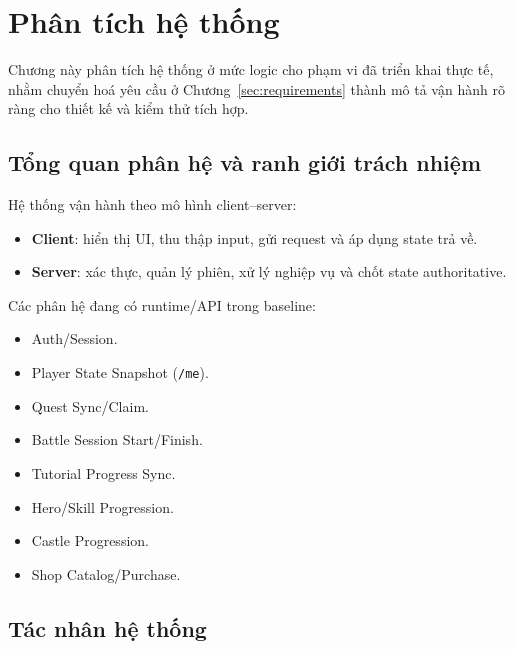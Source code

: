 \section{Phân tích hệ thống}
\label{sec:analysis}

Chương này phân tích hệ thống ở mức logic cho phạm vi đã triển khai thực tế, nhằm chuyển hoá yêu cầu ở Chương~\ref{sec:requirements} thành mô tả vận hành rõ ràng cho thiết kế và kiểm thử tích hợp.

\subsection{Tổng quan phân hệ và ranh giới trách nhiệm}
\label{subsec:analysis_overview}

Hệ thống vận hành theo mô hình client--server:
\begin{itemize}
    \item \textbf{Client}: hiển thị UI, thu thập input, gửi request và áp dụng state trả về.
    \item \textbf{Server}: xác thực, quản lý phiên, xử lý nghiệp vụ và chốt state authoritative.
\end{itemize}

Các phân hệ đang có runtime/API trong baseline:
\begin{itemize}
    \item Auth/\allowbreak Session.
    \item Player State Snapshot (\texttt{/me}).
    \item Quest Sync/\allowbreak Claim.
    \item Battle Session Start/\allowbreak Finish.
    \item Tutorial Progress Sync.
    \item Hero/\allowbreak Skill Progression.
    \item Castle Progression.
    \item Shop Catalog/\allowbreak Purchase.
\end{itemize}

\subsection{Tác nhân hệ thống}
\label{subsec:analysis_actors}

